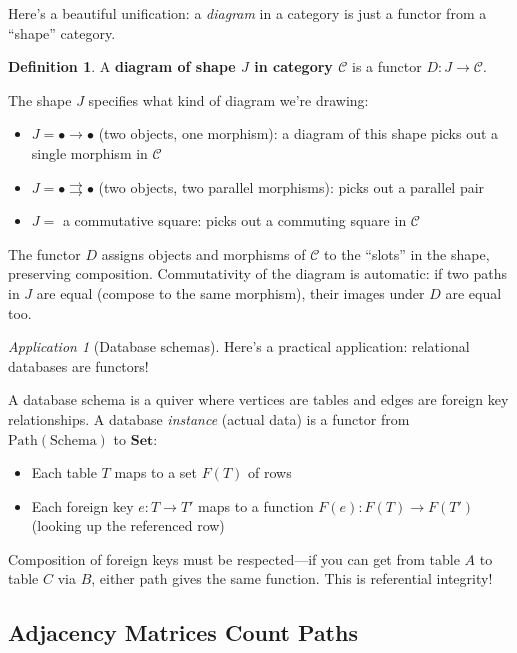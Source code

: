 \documentclass[11pt]{article}
\newcommand{\cat}[1]{\mathbf{#1}}
\newcommand{\Set}{\cat{Set}}
\theoremstyle{definition}
\newtheorem{definition}{Definition}[section]
\theoremstyle{plain}
\theoremstyle{remark}
\newtheorem*{application}{Application}
\begin{document}
Here's a beautiful unification: a \emph{diagram} in a category is just a functor from a ``shape'' category.

\begin{definition}
A \textbf{diagram of shape $J$ in category $\mathcal{C}$} is a functor $D: J \to \mathcal{C}$.
\end{definition}

The shape $J$ specifies what kind of diagram we're drawing:
\begin{itemize}
  \item $J = \bullet \to \bullet$ (two objects, one morphism): a diagram of this shape picks out a single morphism in $\mathcal{C}$
  \item $J = \bullet \rightrightarrows \bullet$ (two objects, two parallel morphisms): picks out a parallel pair
  \item $J = $ a commutative square: picks out a commuting square in $\mathcal{C}$
\end{itemize}

The functor $D$ assigns objects and morphisms of $\mathcal{C}$ to the ``slots'' in the shape, preserving composition. Commutativity of the diagram is automatic: if two paths in $J$ are equal (compose to the same morphism), their images under $D$ are equal too.

\begin{application}[Database schemas]
Here's a practical application: relational databases are functors!

A database schema is a quiver where vertices are tables and edges are foreign key relationships. A database \emph{instance} (actual data) is a functor from $\text{Path}(\text{Schema})$ to $\Set$:
\begin{itemize}
  \item Each table $T$ maps to a set $F(T)$ of rows
  \item Each foreign key $e: T \to T'$ maps to a function $F(e): F(T) \to F(T')$ (looking up the referenced row)
\end{itemize}
Composition of foreign keys must be respected---if you can get from table $A$ to table $C$ via $B$, either path gives the same function. This is referential integrity!
\end{application}

\subsection{Adjacency Matrices Count Paths}
\end{document}
